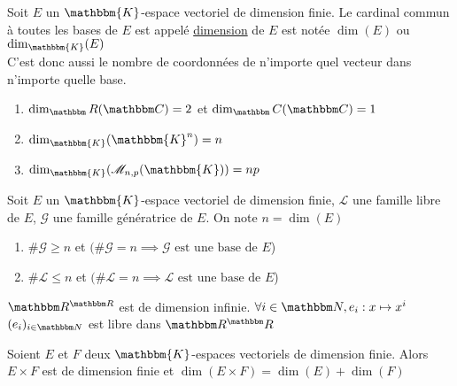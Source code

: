 \begin{defn}
	Soit $E$ un $\mathbbm{K}$-espace vectoriel de dimension finie. Le cardinal commun à toutes les bases de $E$ est appelé \underline{dimension} de $E$ est notée $\dim(E)$ ou $\dim_\mathbbm{K}(E)$\\
	C'est donc aussi le nombre de coordonnées de n'importe quel vecteur dans n'importe quelle base.
\end{defn}

\begin{exm}
	\begin{enumerate}
		\item $\dim_\R(\C) = 2$ et $\dim_\C(\C) = 1$ 
		\item $\dim_\mathbbm{K}(\mathbbm{K}^{n}) = n$ 
		\item $\dim_{\mathbbm{K}}(\mathcal{M}_{n,p}(\mathbbm{K})) = np$
	\end{enumerate}
\end{exm}

\begin{crlr}
	Soit $E$ un $\mathbbm{K}$-espace vectoriel de dimension finie, $\mathcal{L}$ une famille libre de $E$, $\mathcal{G}$ une famille génératrice de $E$. On note $n = \dim(E)$
	\begin{enumerate}
		\item $\#\mathcal{G} \ge n$ et $(\#\mathcal{G} = n \implies \mathcal{G} \text{ est une base de } E$)
		\item $\#\mathcal{L} \le n$ et $(\#\mathcal{L} = n \implies \mathcal{L} \text{ est une base de } E$)
	\end{enumerate}
\end{crlr}

\begin{crlr}
	$\R^{\R}$ est de dimension infinie.
	$\forall i \in \N, e_i: x \mapsto x^i$\\
	$(e_i)_{i\in\N}$ est libre dans $\R^\R$
\end{crlr}

\begin{prop}
	Soient $E$ et $F$ deux $\mathbbm{K}$-espaces vectoriels de dimension finie. Alors $E\times F$ est de dimension finie et $\dim(E\times F) = \dim(E) + \dim(F)$
\end{prop}


